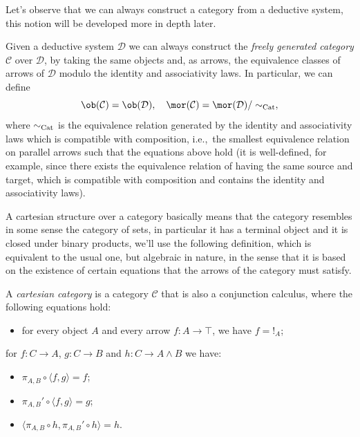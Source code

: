 Let's observe that we can always construct a category from a deductive system, this notion will be developed more in depth later.

\begin{remark}\label{rem:category-generated-by-deductive-system}
    Given a deductive system $\mathcal D$ we can always construct the \textit{freely generated category} $\mathcal C$ over $\mathcal D$, by taking the same objects and, as arrows, the equivalence classes of arrows of $\mathcal D$ modulo the identity and associativity laws.
    In particular, we can define
    \[ \ob(\mathcal C) = \ob(\mathcal D), \quad \mor(\mathcal C) = \mor(\mathcal D)/\sim_{\textnormal{Cat}}, \]
    where $\sim_{\textnormal{Cat}}$ is the equivalence relation generated by the identity and associativity laws which is compatible with composition,
    i.e.,\ the smallest equivalence relation on parallel arrows such that the equations above hold (it is well-defined, for example, since there exists the equivalence relation of having the same source and target, which is compatible with composition and contains the identity and associativity laws). 
\end{remark}

A cartesian structure over a category basically means that the category resembles in some sense the category of sets, in particular it has a terminal object and it is closed under binary products,
we'll use the following definition, which is equivalent to the usual one, but algebraic in nature, in the sense that it is based on the existence of certain equations that the arrows of the category must satisfy.

\begin{definition}
    A \textit{cartesian category} is a category $\mathcal C$ that is also a conjunction calculus, where the following equations hold:
    \begin{itemize}
        \item[(\textnormal{CC1})] for every object $A$ and every arrow $f : A \to \top$, we have $f = !_A$;
    \end{itemize}
    for $f : C \to A$, $g : C \to B$ and $h : C \to A \land B$ we have:
    \begin{itemize}
        \item[(\textnormal{CC2a})] $\pi_{A,B} \circ \langle f,g\rangle = f$;
        \item[(\textnormal{CC2b})] $\pi_{A,B}' \circ \langle f,g\rangle = g$;
        \item[(\textnormal{CC2c})] $\langle \pi_{A,B} \circ h, \pi_{A,B}' \circ h\rangle = h$.
    \end{itemize}
\end{definition}

